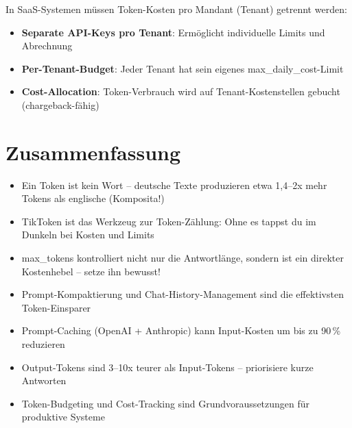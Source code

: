 In SaaS-Systemen müssen Token-Kosten pro Mandant (Tenant) getrennt werden:

\begin{itemize}[leftmargin=*]
    \item \textbf{Separate API-Keys pro Tenant}: Ermöglicht individuelle Limits und Abrechnung
    \item \textbf{Per-Tenant-Budget}: Jeder Tenant hat sein eigenes max\_daily\_cost-Limit
    \item \textbf{Cost-Allocation}: Token-Verbrauch wird auf Tenant-Kostenstellen gebucht (chargeback-fähig)
\end{itemize}

\section{Zusammenfassung}

\begin{itemize}[leftmargin=*]
    \item Ein Token ist kein Wort -- deutsche Texte produzieren etwa 1,4--2x mehr Tokens als englische (Komposita!)
    \item TikToken ist das Werkzeug zur Token-Zählung: Ohne es tappst du im Dunkeln bei Kosten und Limits
    \item max\_tokens kontrolliert nicht nur die Antwortlänge, sondern ist ein direkter Kostenhebel -- setze ihn bewusst!
    \item Prompt-Kompaktierung und Chat-History-Management sind die effektivsten Token-Einsparer
    \item Prompt-Caching (OpenAI + Anthropic) kann Input-Kosten um bis zu 90\,\% reduzieren
    \item Output-Tokens sind 3--10x teurer als Input-Tokens -- priorisiere kurze Antworten
    \item Token-Budgeting und Cost-Tracking sind Grundvoraussetzungen für produktive Systeme
\end{itemize}

